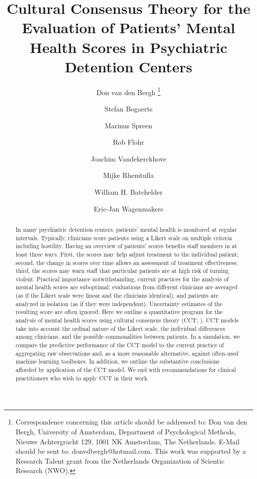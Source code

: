 \documentclass[a4paper]{article}
\title{Cultural Consensus Theory for the Evaluation of Patients' Mental Health Scores in Psychiatric Detention Centers}
\author[1]{Don van den Bergh%
\thanks{Correspondence concerning this article should be addressed to: Don van den Bergh, University of Amsterdam, Department of Psychological Methods, Nieuwe Achtergracht 129, 1001 NK Amsterdam, The Netherlands. E-Mail should be sent to: donvdbergh@hotmail.com. This work was supported by a Research Talent grant from the Netherlands Organization of Scientic Research (NWO).
}}
\author[2]{Stefan Bogaerts}
\author[3]{Marinus Spreen}
\author[3]{Rob Flohr}
\author[4]{Joachim Vandekerckhove}
\author[5]{Mijke Rhemtulla}
\author[4]{William H. Batchelder}
\author[1]{Eric-Jan Wagenmakers}
\affil[1]{University of Amsterdam}
\affil[2]{University of Tilburg}
\affil[3]{Stenden University of Applied Sciences}
\affil[4]{University of California Irvine}
\affil[5]{University of California Davis}
\date{}
\begin{document}

%
%
%



\maketitle

\begin{abstract}
In many psychiatric detention centers, patients' mental health is monitored at regular intervals. Typically, clinicians score patients using a Likert scale on multiple criteria including hostility. Having an overview of patients’ scores benefits staff members in at least three ways. First, the scores may help adjust treatment to the individual patient; second, the change in scores over time allows an assessment of treatment effectiveness; third, the scores may warn staff that particular patients are at high risk of turning violent. Practical importance notwithstanding, current practices for the analysis of mental health scores are suboptimal: evaluations from different clinicians are averaged (as if the Likert scale were linear and the clinicians identical), and patients are analyzed in isolation (as if they were independent). Uncertainty estimates of the resulting score are often ignored. Here we outline a quantitative program for the analysis of mental health scores using cultural consensus theory (CCT; ). CCT models take into account the ordinal nature of the Likert scale, the individual differences among clinicians, and the possible commonalities between patients. In a simulation, we compare the predictive performance of the CCT model to the current practice of aggregating raw observations and, as a more reasonable alternative, against often-used machine learning toolboxes. In addition, we outline the substantive conclusions afforded by application of the CCT model. We end with recommendations for clinical practitioners who wish to apply CCT in their work. 
\end{abstract}
\newpage
\end{document}
